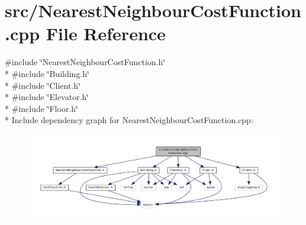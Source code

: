\section{src/\+Nearest\+Neighbour\+Cost\+Function.cpp File Reference}
\label{_nearest_neighbour_cost_function_8cpp}
{\ttfamily \#include \char`\"{}Nearest\+Neighbour\+Cost\+Function.\+h\char`\"{}}\\*
{\ttfamily \#include \char`\"{}Building.\+h\char`\"{}}\\*
{\ttfamily \#include \char`\"{}Client.\+h\char`\"{}}\\*
{\ttfamily \#include \char`\"{}Elevator.\+h\char`\"{}}\\*
{\ttfamily \#include \char`\"{}Floor.\+h\char`\"{}}\\*
Include dependency graph for Nearest\+Neighbour\+Cost\+Function.\+cpp\+:\nopagebreak
\begin{figure}[H]
\begin{center}
\leavevmode
\includegraphics[width=350pt]{_nearest_neighbour_cost_function_8cpp__incl}
\end{center}
\end{figure}
